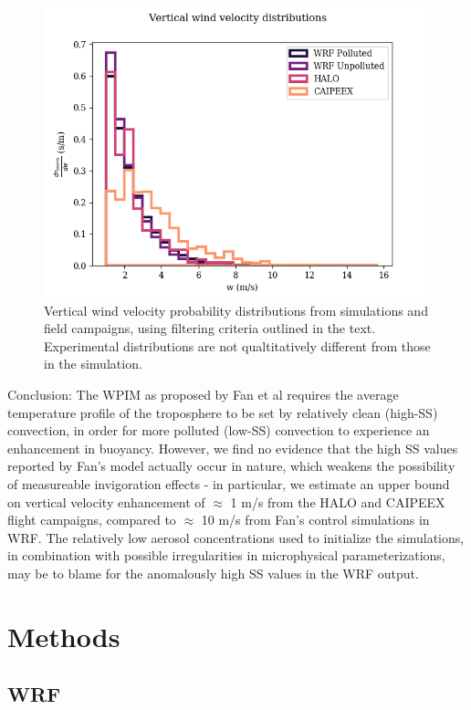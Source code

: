 \documentclass{article}
\begin{document}
\begin{figure}[ht]
    \centering
    \includegraphics[width=12cm]{wrf/combined_w_hist_figure.png}
    \caption{Vertical wind velocity probability distributions from simulations and field campaigns, using filtering criteria outlined in the text. Experimental distributions are not qualtitatively different from those in the simulation.}
    \label{combinedwhist}
\end{figure}

Conclusion: The WPIM as proposed by Fan et al requires the average temperature profile of the troposphere to be set by relatively clean (high-SS) convection, in order for more polluted (low-SS) convection to experience an enhancement in buoyancy. However, we find no evidence that the high SS values reported by Fan's model actually occur in nature, which weakens the possibility of measureable invigoration effects - in particular, we estimate an upper bound on vertical velocity enhancement of $\approx$ 1 m/s from the HALO and CAIPEEX flight campaigns, compared to $\approx$ 10 m/s from Fan's control simulations in WRF. The relatively low aerosol concentrations used to initialize the simulations, in combination with possible irregularities in microphysical parameterizations, may be to blame for the anomalously high SS values in the WRF output.

\clearpage
\newpage

\section{Methods}

\subsection{WRF}
\end{document}
